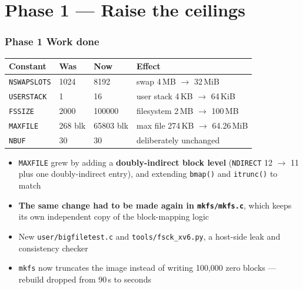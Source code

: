 \documentclass[10pt,aspectratio=169]{beamer}
\newcommand{\good}[1]{\textcolor{good}{#1}}
\newcommand{\warn}[1]{\textcolor{warn}{#1}}
\newcommand{\ca}{\raisebox{0pt}{$\sim$}}   %
\newcommand{\phasehead}[2]{%
  \frametitle{#1 \quad\small\normalfont\textcolor{white!75!accent}{#2}}}
\begin{document}

\section{Phase 1 --- Raise the ceilings}

\begin{frame}
  \phasehead{Phase 1}{Work done}
  \small
  \begin{table}
    \begin{tabular}{@{}llll@{}}
      \toprule
      \textbf{Constant} & \textbf{Was} & \textbf{Now} & \textbf{Effect} \\
      \midrule
      \texttt{NSWAPSLOTS} & 1024    & 8192      & swap 4\,MB $\to$ \good{32\,MiB} \\
      \texttt{USERSTACK}  & 1       & 16        & user stack 4\,KB $\to$ \good{64\,KiB} \\
      \texttt{FSSIZE}     & 2000    & 100000    & filesystem 2\,MB $\to$ \good{100\,MB} \\
      \texttt{MAXFILE}    & 268 blk & 65803 blk & max file 274\,KB $\to$ \good{64.26\,MiB} \\
      \texttt{NBUF}       & 30      & 30        & \warn{deliberately unchanged} \\
      \bottomrule
    \end{tabular}
  \end{table}

  \vspace{-2mm}
  \begin{itemize}
    \item \texttt{MAXFILE} grew by adding a \textbf{doubly-indirect block level}
          (\texttt{NDIRECT} 12 $\to$ 11 plus one doubly-indirect entry), and
          extending \texttt{bmap()} and \texttt{itrunc()} to match
    \item \textbf{The same change had to be made again in \texttt{mkfs/mkfs.c}},
          which keeps its own independent copy of the block-mapping logic
    \item New \texttt{user/bigfiletest.c} and \texttt{tools/fsck\_xv6.py},
          a host-side leak and consistency checker
    \item \texttt{mkfs} now truncates the image instead of writing 100{,}000
          zero blocks --- rebuild dropped from \ca 90\,s to seconds
  \end{itemize}
\end{frame}
\end{document}
